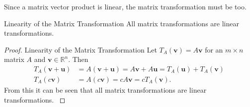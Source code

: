  \noindent Since a matrix vector product is linear, the matrix transformation must be too. 
\begin{theorem}{Linearity of the Matrix Transformation}
    \label{the:linearityMatrixTransformation}
    All matrix transformations are linear transformations.\cite[170]{LiAl}
\end{theorem}
\begin{proof}{Linearity of the Matrix Transformation}
     Let $T_A(\textbf{v})=A\textbf{v}$ for an $m\times n$ matrix $A$ and $\textbf{v} \in \mathbb{R}^n$. Then
     \begin{align*}
         T_A(\textbf{v}+\textbf{u})&=A(\textbf{v}+\textbf{u})=A\textbf{v}+A\textbf{u}=T_A(\textbf{u})+T_A(\textbf{v})\\
         T_A(c\textbf{v})&=A(c\textbf{v})=cA\textbf{v}=cT_A(\textbf{v}).
     \end{align*}
     From this it can be seen that all matrix transformations are linear transformations. \cite[170]{LiAl}\qedsymbol
\end{proof}

